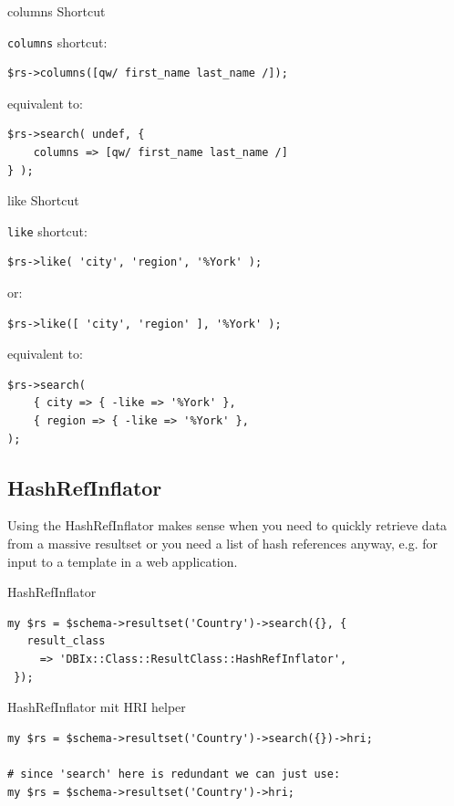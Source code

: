 \begin{frame}[fragile]{columns Shortcut}

\verb|columns| shortcut:

\begin{lstlisting}
$rs->columns([qw/ first_name last_name /]);
\end{lstlisting}

equivalent to:

\begin{lstlisting}
$rs->search( undef, { 
    columns => [qw/ first_name last_name /] 
} );
\end{lstlisting}
\end{frame}

\begin{frame}[fragile]{like Shortcut}

\verb|like| shortcut:

\begin{lstlisting}
$rs->like( 'city', 'region', '%York' );
\end{lstlisting}

or:

\begin{lstlisting}
$rs->like([ 'city', 'region' ], '%York' );
\end{lstlisting}

equivalent to:

\begin{lstlisting}
$rs->search(
    { city => { -like => '%York' },
    { region => { -like => '%York' },
);
\end{lstlisting}
\end{frame}

\subsection{HashRefInflator}

Using the HashRefInflator makes sense when you need to quickly retrieve
data from a massive resultset or you need a list of hash references anyway,
e.g. for input to a template in a web application.

\begin{frame}[fragile]{HashRefInflator}
\begin{lstlisting}
my $rs = $schema->resultset('Country')->search({}, {
   result_class
     => 'DBIx::Class::ResultClass::HashRefInflator',
 });
\end{lstlisting}
\end{frame}

\begin{frame}[fragile]{HashRefInflator mit HRI helper}
\begin{lstlisting}
my $rs = $schema->resultset('Country')->search({})->hri;

# since 'search' here is redundant we can just use:
my $rs = $schema->resultset('Country')->hri;
\end{lstlisting}
\end{frame}

